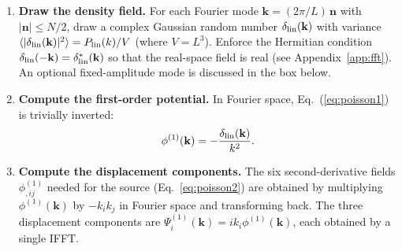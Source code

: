 \documentclass[12pt]{article}
\newcommand{\bk}{\mathbf{k}}
\begin{document}
\begin{enumerate}
  \item \textbf{Draw the density field.}  For each Fourier mode
    $\bk = (2\pi/L)\,\mathbf{n}$ with $|\mathbf{n}| \leq N/2$,
    draw a complex Gaussian random number $\delta_{\rm lin}(\bk)$
    with variance $\langle|\delta_{\rm lin}(\bk)|^2\rangle =
    P_{\rm lin}(k)/V$ (where $V=L^3$).  Enforce the Hermitian
    condition $\delta_{\rm lin}(-\bk)=\delta_{\rm lin}^*(\bk)$ so
    that the real-space field is real (see Appendix~\ref{app:fft}).
    An optional fixed-amplitude mode is discussed in the box below.

  \item \textbf{Compute the first-order potential.}  In Fourier space,
    Eq.~(\ref{eq:poisson1}) is trivially inverted:
    \begin{equation}
      \phi^{(1)}(\bk) = -\frac{\delta_{\rm lin}(\bk)}{k^2}.
      \label{eq:phi1_fourier}
    \end{equation}

  \item \textbf{Compute the displacement components.}  The six
    second-derivative fields $\phi^{(1)}_{,ij}$ needed for the
    source (Eq.~\ref{eq:poisson2}) are obtained by multiplying
    $\phi^{(1)}(\bk)$ by $-k_ik_j$ in Fourier space and
    transforming back.  The three displacement components are
    $\Psi^{(1)}_i(\bk) = ik_i\phi^{(1)}(\bk)$, each obtained by
    a single IFFT.
\end{enumerate}
\end{document}
